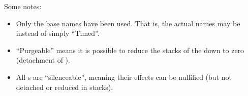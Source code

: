 Some notes:

\begin{itemize}
	\item{Only the base names have been used. That is, the actual names may be\\  instead of simply ``Timed''.}
	\item{``Purgeable'' means it is possible to reduce the stacks of the  down to zero (detachment of ).}
	\item{All s are ``silenceable'', meaning their effects can be nullified (but not detached or reduced in stacks).}
\end{itemize}


\postamble{}